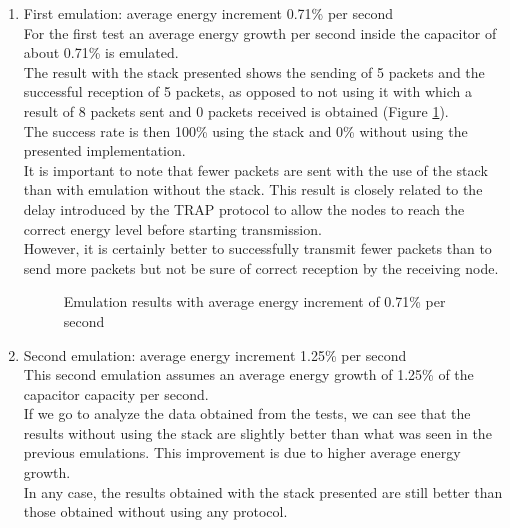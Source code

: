 \begin{enumerate}
\item First emulation: average energy increment 0.71\% per second\\
For the first test an average energy growth per second inside the capacitor of about 0.71\% is emulated.\\
The result with the stack presented shows the sending of 5 packets and the successful reception of 5 packets, as opposed to not using it with which a result of 8 packets sent and 0 packets received is obtained (Figure \ref{fig:FGFT0}).\\
The success rate is then 100\% using the stack and 0\% without using the presented implementation.\\
It is important to note that fewer packets are sent with the use of the stack than with emulation without the stack. This result is closely related to the delay introduced by the TRAP protocol to allow the nodes to reach the correct energy level before starting transmission.\\
However, it is certainly better to successfully transmit fewer packets than to send more packets but not be sure of correct reception by the receiving node.
\begin{figure}[H]
\centerline{}\caption{\footnotesize \centering Emulation results with average energy increment of 0.71\% per second}
\label{fig:FGFT0}
\end{figure}
\begin{comment}
\begin{figure}[H]
\centerline{\psfig{file=Images/9060071RATIO.png,width=0.7\textwidth}}
\caption{\footnotesize \centering Success ratio of transmission with average energy increment of 0.71\% per second}
\label{fig:FGFT1}
\end{figure}
\end{comment}
\item Second emulation: average energy increment 1.25\% per second\\
This second emulation assumes an average energy growth of 1.25\% of the capacitor capacity per second.\\
If we go to analyze the data obtained from the tests, we can see that the results without using the stack are slightly better than what was seen in the previous emulations. This improvement is due to higher average energy growth.\\
In any case, the results obtained with the stack presented are still better than those obtained without using any protocol.

\end{enumerate}
